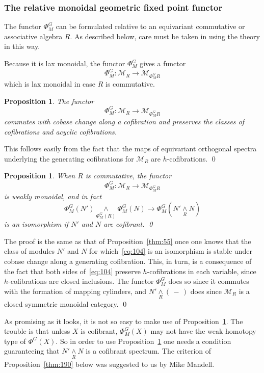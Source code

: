 \documentclass{amsart}
\newtheorem{prop}[equation]{Proposition}
\theoremstyle{definition}
\theoremstyle{remark}
\newenvironment{pf}{\bigskip{\em Proof:\/}}{\qed\medskip}
\newcommand{\slot}{\,-\,}
\newcommand{\rmod}[1]{\mathcal M_{#1}}
\newcommand{\smashove}[1]{\underset{#1}{\wedge}}
\newcommand{\gfp}[1]{\Phi^{#1}}
\newcommand{\gfpm}[1]{\Phi_{M}^{#1}}
\newcommand{\phig}{\gfp{G}}
\newcommand{\phigm}{\gfpm{G}}
\begin{document}
\subsubsection{The relative monoidal geometric fixed point functor}
\label{sec:relat-mono-geom}

The functor $\phigm$ can be formulated relative to an equivariant
commutative or associative algebra $R$.  As described below, care must
be taken in using the theory in this way.

Because it is lax monoidal, the functor $\phigm$ gives a functor 
\[
\phigm:\rmod{R}\to \rmod{\phigm R}
\]
which is lax monoidal in case $R$ is commutative.

\begin{prop}
\label{thm:15}
The functor 
\[
\phigm:\rmod{R}\to \rmod{\phigm R}
\]
commutes with cobase change along a cofibration and preserves the
classes of cofibrations and acyclic cofibrations.  
\end{prop}


\begin{pf}
This follows easily from the fact that the maps of equivariant
orthogonal spectra underlying the generating cofibrations for
$\rmod{R}$ are $h$-cofibrations.
\end{pf}

\begin{prop}
\label{thm:174} 
When $R$ is commutative, the functor
\[
\phigm:\rmod{R}\to \rmod{\phigm R}
\]
is weakly monoidal, and in fact
\begin{equation}
\label{eq:104}
\phigm(N')\smashove{\phigm(R)}\phigm(N) \to 
\phigm(N'\smashove{R}N)
\end{equation}
is an isomorphism if $N'$ and $N$ are cofibrant.  \qed
\end{prop}


\begin{pf}
The proof is the same as that of Proposition~\ref{thm:55} once one
knows that the class of modules $N'$ and $N$ for which~\eqref{eq:104}
is an isomorphism is stable under cobase change along a generating
cofibration.  This, in turn, is a consequence of the fact that both
sides of~\eqref{eq:104} preserve $h$-cofibrations in each variable,
since $h$-cofibrations are closed inclusions.  The functor $\phigm$
does so since it commutes with the formation of mapping cylinders, and
$N'\smashove{R}(\slot)$ does since $\rmod{R}$ is a closed symmetric
monoidal category.
\end{pf}

As promising as it looks, it is not so easy to make use of
Proposition~\ref{thm:174}.  The trouble is that unless $X$ is
cofibrant, $\phigm(X)$ may not have the weak homotopy type of
$\phig(X)$.  So in order to use Proposition~\ref{thm:174} one needs a
condition guaranteeing that $N'\smashove{R}N$ is a cofibrant spectrum.
The criterion of Proposition~\ref{thm:190} below was suggested to us
by Mike Mandell.
\end{document}

